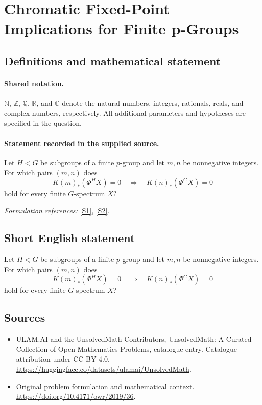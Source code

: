 \documentclass[11pt]{article}
\newcommand{\sref}[2]{\hyperlink{source:#1:#2}{[S#2]}}
\begin{document}
\section{Chromatic Fixed-Point Implications for Finite p-Groups}\label{statement}

\subsection{Definitions and mathematical statement}

\paragraph{Shared notation.}$\mathbb N$, $\mathbb Z$, $\mathbb Q$, $\mathbb R$, and $\mathbb C$ denote the natural numbers, integers, rationals, reals, and complex numbers, respectively. All additional parameters and hypotheses are specified in the question.


\paragraph{Statement recorded in the supplied source.}
Let $H<G$ be subgroups of a finite $p$-group and let $m,n$ be nonnegative integers. For which pairs $(m,n)$ does $$K(m)_*(\Phi^H X)=0\quad\Longrightarrow\quad K(n)_*(\Phi^G X)=0$$ hold for every finite $G$-spectrum $X$?
\par\smallskip\textit{Formulation references:} \sref{statement}{1}, \sref{statement}{2}.
\subsection{Short English statement}
Let $H<G$ be subgroups of a finite $p$-group and let $m,n$ be nonnegative integers. For which pairs $(m,n)$ does $$K(m)_*(\Phi^H X)=0\quad\Longrightarrow\quad K(n)_*(\Phi^G X)=0$$ hold for every finite $G$-spectrum $X$?
\subsection{Sources}
\begin{itemize}
\item[\hypertarget{source:statement:1}{S1}] ULAM.AI and the UnsolvedMath Contributors, UnsolvedMath: A Curated Collection of Open Mathematics Problems, catalogue entry. Catalogue attribution under CC BY 4.0.
\url{https://huggingface.co/datasets/ulamai/UnsolvedMath}.
\item[\hypertarget{source:statement:2}{S2}] Original problem formulation and mathematical context.
\url{https://doi.org/10.4171/owr/2019/36}.
\end{itemize}
\label{end:statement}
\end{document}
